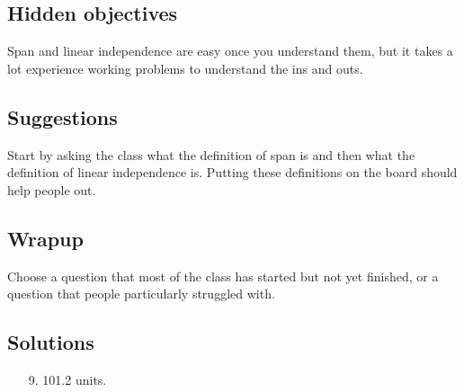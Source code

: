 \documentclass[11pt]{exam}
\begin{document}
\subsection*{Hidden objectives}

	Span and linear independence are easy once you understand them, 
	but it takes a lot experience working problems to understand the ins and outs.

\subsection*{Suggestions}
	
	Start by asking the class what the definition of span is and then what
	the definition of linear independence is.  Putting these definitions
	on the board should help people out.

\subsection*{Wrapup}
	Choose a question that most of the class has started but not yet finished,
	or a question that people particularly struggled with.

\subsection*{Solutions}
\begin{enumerate}
	\item[9.] 101.2 units.
\end{enumerate}
	
\end{document}
